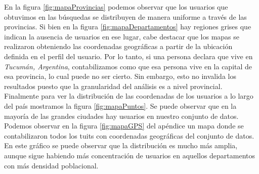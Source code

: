 En la figura \ref{fig:mapaProvincias} podemos observar que los usuarios que obtuvimos en las búsquedas se distribuyen de manera uniforme a través de las provincias. Si bien en la figura \ref{fig:mapaDepartamentos} hay regiones grises que indican la ausencia de usuarios en ese lugar, cabe destacar que los mapas se realizaron obteniendo las coordenadas geográficas a partir de la ubicación definida en el perfil del usuario. Por lo tanto, si una persona declara que vive en \textit{Tucumán, Argentina}, contabilizamos como que esa persona vive en la capital de esa provincia, lo cual puede no ser cierto. Sin embargo, esto no invalida los resultados puesto que la granularidad del análisis es a nivel provincial. Finalmente para ver la distribución de las coordenadas de los usuarios a lo largo del país mostramos la figura \ref{fig:mapaPuntos}. Se puede observar que en la mayoría de las grandes ciudades hay usuarios en nuestro conjunto de datos. Podemos observar en la figura \ref{fig:mapaGPS} del apéndice un mapa donde se contabilizaron todos los tuits con coordenadas geográficas del conjunto de datos. En este gráfico se puede observar que la distribución es mucho más amplia, aunque sigue habiendo más concentración de usuarios en aquellos departamentos con más densidad poblacional.



